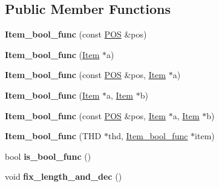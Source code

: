 \subsection*{Public Member Functions}
\begin{DoxyCompactItemize}
\item 
\mbox{\label{classItem__bool__func_a5a0ac7629022ab58ff58cbf3fbb86d2a}} 
{\bfseries Item\+\_\+bool\+\_\+func} (const \mbox{\hyperlink{structYYLTYPE}{P\+OS}} \&pos)
\item 
\mbox{\label{classItem__bool__func_a20048ed6f90632856d17f0e61cc615a2}} 
{\bfseries Item\+\_\+bool\+\_\+func} (\mbox{\hyperlink{classItem}{Item}} $\ast$a)
\item 
\mbox{\label{classItem__bool__func_adbc140c46f494466ee9a2be874092b37}} 
{\bfseries Item\+\_\+bool\+\_\+func} (const \mbox{\hyperlink{structYYLTYPE}{P\+OS}} \&pos, \mbox{\hyperlink{classItem}{Item}} $\ast$a)
\item 
\mbox{\label{classItem__bool__func_a986e8080889a5d6362ed549498ea5db1}} 
{\bfseries Item\+\_\+bool\+\_\+func} (\mbox{\hyperlink{classItem}{Item}} $\ast$a, \mbox{\hyperlink{classItem}{Item}} $\ast$b)
\item 
\mbox{\label{classItem__bool__func_a2ff041fd2f9fad95994c374e118027ba}} 
{\bfseries Item\+\_\+bool\+\_\+func} (const \mbox{\hyperlink{structYYLTYPE}{P\+OS}} \&pos, \mbox{\hyperlink{classItem}{Item}} $\ast$a, \mbox{\hyperlink{classItem}{Item}} $\ast$b)
\item 
\mbox{\label{classItem__bool__func_a8d46a70979146558831ca0d03e425f87}} 
{\bfseries Item\+\_\+bool\+\_\+func} (T\+HD $\ast$thd, \mbox{\hyperlink{classItem__bool__func}{Item\+\_\+bool\+\_\+func}} $\ast$item)
\item 
\mbox{\label{classItem__bool__func_a0401859a93d014b865b356870a096e02}} 
bool {\bfseries is\+\_\+bool\+\_\+func} ()
\item 
\mbox{\label{classItem__bool__func_a4fa9b1c0b7c51303d2616a7a4991d8f6}} 
void {\bfseries fix\+\_\+length\+\_\+and\+\_\+dec} ()

\end{DoxyCompactItemize}
